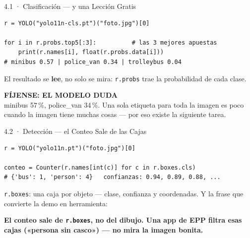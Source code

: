 \documentclass[aspectratio=169, 11pt]{beamer}
\begin{document}
\begin{frame}[fragile, shrink=5]{4.1 · Clasificación --- y una Lección Gratis}
  \vspace{2pt}
  \begin{verbatim}
r = YOLO("yolo11n-cls.pt")("foto.jpg")[0]

for i in r.probs.top5[:3]:          # las 3 mejores apuestas
    print(r.names[i], float(r.probs.data[i]))
# minibus 0.57 | police_van 0.34 | trolleybus 0.04
  \end{verbatim}
  \vspace{5pt}
  {\footnotesize\color{textMuted}
   El resultado se \textbf{lee}, no solo se mira: \texttt{r.probs} trae la
   probabilidad de cada clase.}
  \vspace{5pt}
  \begin{tcolorbox}[colback=arcaGray, colframe=arcaRed, boxrule=0pt,
    leftrule=3pt, arc=3pt, left=8pt, right=8pt, top=4pt, bottom=4pt]
    {\scriptsize\color{arcaRed}\bfseries FÍJENSE: EL MODELO DUDA}\\[2pt]
    {\footnotesize\color{textMuted}
     minibus 57\,\%, police\_van 34\,\%. Una sola etiqueta para toda la
     imagen es poco cuando la imagen tiene muchas cosas --- por eso existe
     la siguiente tarea.}
  \end{tcolorbox}
\end{frame}

\begin{frame}[fragile, shrink=5]{4.2 · Detección --- el Conteo Sale de las Cajas}
  \vspace{2pt}
  \begin{verbatim}
r = YOLO("yolo11n.pt")("foto.jpg")[0]

conteo = Counter(r.names[int(c)] for c in r.boxes.cls)
# {'bus': 1, 'person': 4}   confianzas: 0.94, 0.89, 0.88, ...
  \end{verbatim}
  \vspace{5pt}
  {\footnotesize\color{textMuted}
   \texttt{r.boxes}: una caja por objeto --- clase, confianza y coordenadas.
   Y la frase que convierte la demo en herramienta:}
  \vspace{5pt}
  \begin{tcolorbox}[colback=arcaGray, colframe=arcaDark, boxrule=0pt,
    leftrule=4pt, arc=3pt, left=10pt, right=10pt, top=6pt, bottom=6pt]
    {\footnotesize\color{arcaDark}\bfseries
     El conteo sale de \texttt{r.boxes}, no del dibujo. Una app de EPP
     filtra esas cajas («persona sin casco») --- no mira la imagen bonita.}
  \end{tcolorbox}
\end{frame}
\end{document}
